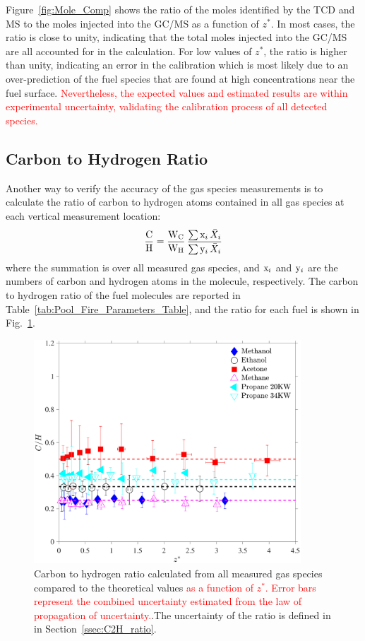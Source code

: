 \documentclass[12pt]{article}
\begin{document}
Figure~\ref{fig:Mole_Comp} shows the ratio of the moles identified by the TCD and MS to the moles injected into the GC/MS as a function of $z^*$. In most cases, the ratio is close to unity, indicating that the total moles injected into the GC/MS are all accounted for in the calculation. For low values of $z^*$, the ratio is higher than unity, indicating an error in the calibration which is most likely due to an over-prediction of the fuel species that are found at high concentrations near the fuel surface. \textcolor{red}{Nevertheless, the expected values and estimated results are within experimental uncertainty, validating the calibration process of all detected species.}

\subsection{Carbon to Hydrogen Ratio}

Another way to verify the accuracy of the gas species measurements is to calculate the ratio of carbon to hydrogen atoms contained in all gas species at each vertical measurement location:
\begin{equation}\label{eq:c2h_ratio}
  \frac{\rm C}{\rm H}= \frac{\textrm{W}_{\rm{C}}}{\textrm{W}_{\rm{H}}}\, \frac{ \sum  {\rm x}_i \, \bar{X}_{i}}{\sum {\rm y}_i \, \bar{X}_{i}}
\end{equation}
where the summation is over all measured gas species, and ${\rm x}_i$ and ${\rm y}_i$ are the numbers of carbon and hydrogen atoms in the molecule, respectively. The carbon to hydrogen ratio of the fuel molecules are reported in Table~\ref{tab:Pool_Fire_Parameters_Table}, and the ratio for each fuel is shown in Fig.~\ref{fig:C2H}.

\begin{figure}[h!]
	\centering
\includegraphics[width=10.0cm, keepaspectratio]{C2H_ratio_Comparison.pdf}
	\caption[Carbon to hydrogen ratio calculated from all species]{Carbon to hydrogen ratio calculated from all measured gas species compared to the theoretical values \textcolor{red}{ as a function of $z^*$. Error bars represent the combined uncertainty estimated from the law of propagation of uncertainty.}.The uncertainty of the ratio is defined in in Section~\ref{ssec:C2H_ratio}.}
	\label{fig:C2H}
\end{figure}
\end{document}
